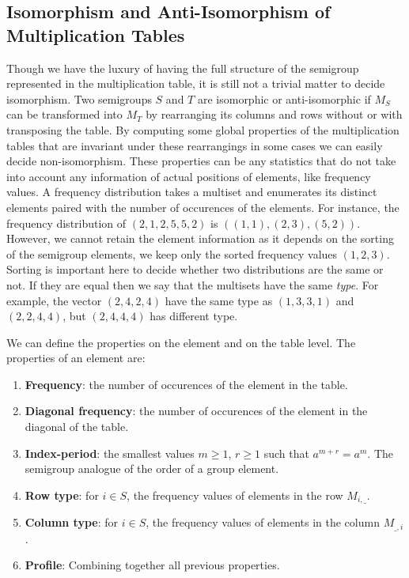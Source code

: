 \documentclass{amsart}
\theoremstyle{plain}
\theoremstyle{definition}
\begin{document}
\subsection{Isomorphism and Anti-Isomorphism of Multiplication Tables}
Though we have the luxury of having the full structure of the semigroup represented in the multiplication table, it is still not a trivial matter to decide isomorphism.
Two semigroups $S$ and $T$ are isomorphic or anti-isomorphic if $M_S$ can be transformed into $M_T$ by rearranging its columns and rows without or with transposing the table.
By computing some global properties of the multiplication tables that are invariant under these rearrangings in some cases we can easily decide non-isomorphism.
These properties can be any statistics that do not take into account any information of actual positions of elements, like frequency values.
A frequency distribution takes a multiset and enumerates its distinct elements paired with the number of occurences of the elements.
For instance, the  frequency distribution of $(2,1,2,5,5,2)$ is $((1,1),(2,3),(5,2))$.
However, we cannot retain the element information as it depends on the sorting of the semigroup elements, we keep only the sorted frequency values $(1,2,3)$.
Sorting is important here to decide whether two distributions are the same or not.
If they are equal then we say that the multisets have the same \emph{type}.
For example, the vector $(2,4,2,4)$ have the same type as $(1,3,3,1)$ and $(2,2,4,4)$, but $(2,4,4,4)$ has different type.


We can define the properties on the element and on the table level. The properties of an element are:

\begin{enumerate}
\item\textbf{Frequency}: the number of occurences of the element in the table.
\item \textbf{Diagonal frequency}: the number of occurences of the element in the diagonal of the table.
\item \textbf{Index-period}: the smallest values $m\geq 1$, $r\geq 1$ such that $a^{m+r}=a^m$. The semigroup analogue of the order of a group element.
\item \textbf{Row type}: for $i\in S$, the frequency values of elements in the row $M_{i,\_}$.
\item \textbf{Column type}:  for $i\in S$, the frequency values of elements in the column $M_{\_,i}$.
\item \textbf{Profile}: Combining together all previous properties.
\end{enumerate} 
\end{document}
